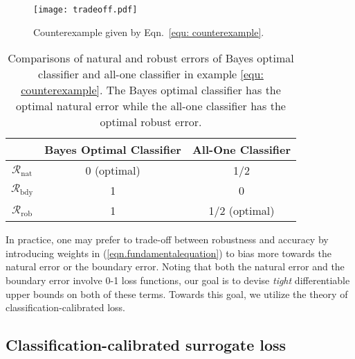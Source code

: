 \documentclass[11pt]{article}
\newcommand{\adv}{\mathrm{rob}}
\newcommand{\nat}{\mathrm{nat}}
\newcommand{\0}{\mathbf{0}}
\newcommand{\1}{\mathbf{1}}
\newcommand{\cR}{\mathcal{R}}
\begin{document}
\begin{figure}
\centering
\texttt{[image: tradeoff.pdf]}
\caption{Counterexample given by Eqn.~\eqref{equ: counterexample}.}
\label{figure: tradeoff}
\end{figure}

\begin{table}
\caption{Comparisons of natural and robust errors of Bayes optimal classifier and all-one classifier in example \eqref{equ: counterexample}. The Bayes optimal classifier has the optimal natural error while the all-one classifier has the optimal robust error.}
\label{table: comparison of error}
\centering
\begin{tabular}{c|c|c}\hline
& Bayes Optimal Classifier & All-One Classifier
\\
\hline
$\cR_\nat$ & 0 (optimal) & 1/2\\
\hline
$\cR_{\text{bdy}}$ & 1 & 0 \\
\hline
$\cR_\adv$ & 1 & 1/2 (optimal)\\
\hline
\end{tabular}
\vspace{-0.4cm}
\end{table}

\medskip
{}
In practice, one may prefer to trade-off between robustness and accuracy by introducing weights in (\ref{eqn.fundamentalequation}) to bias more towards the natural error or the boundary error. Noting that both the natural error and the boundary error involve 0-1 loss functions, our goal is to devise \emph{tight} differentiable upper bounds on both of these terms. Towards this goal, we utilize the theory of classification-calibrated loss. 










\subsection{Classification-calibrated surrogate loss}
\end{document}
